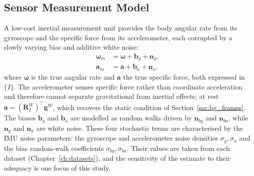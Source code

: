 \subsection{Sensor Measurement Model}
\label{sec:bg_imu_meas}
A low-cost inertial measurement unit provides the body angular rate from its gyroscope and the specific force from its accelerometer, each corrupted by a slowly varying bias and additive white noise:
\begin{align}
  \boldsymbol{\omega}_m &= \boldsymbol{\omega} + \mathbf{b}_g + \mathbf{n}_g, \\
  \mathbf{a}_m &= \mathbf{a} + \mathbf{b}_a + \mathbf{n}_a,
\end{align}
where $\boldsymbol{\omega}$ is the true angular rate and $\mathbf{a}$ the true specific force, both expressed in $\{I\}$. The accelerometer senses specific force rather than coordinate acceleration and therefore cannot separate gravitational from inertial effects; at rest $\mathbf{a} = (\mathbf{R}_I^{W})^{\top}\mathbf{g}^{W}$, which recovers the static condition of Section~\ref{sec:bg_frames}. The biases $\mathbf{b}_g$ and $\mathbf{b}_a$ are modelled as random walks driven by $\mathbf{n}_{bg}$ and $\mathbf{n}_{ba}$, while $\mathbf{n}_g$ and $\mathbf{n}_a$ are white noise. These four stochastic terms are characterised by the IMU noise parameters: the gyroscope and accelerometer noise densities $\sigma_g, \sigma_a$ and the bias random-walk coefficients $\sigma_{bg}, \sigma_{ba}$. Their values are taken from each dataset (Chapter~\ref{ch:datasets}), and the sensitivity of the estimate to their adequacy is one focus of this study.

